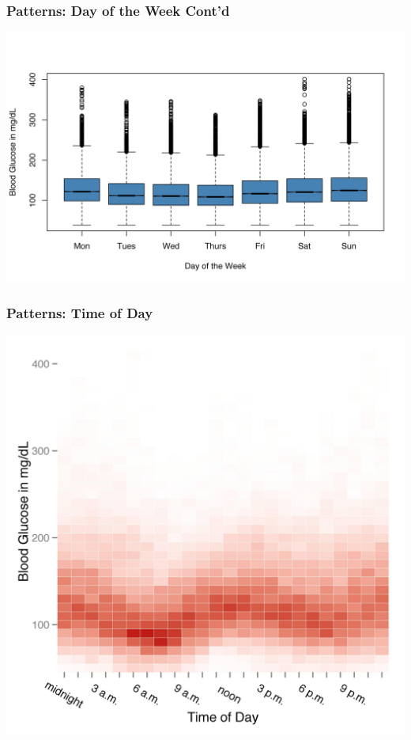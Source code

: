 \documentclass[handout]{beamer}
\begin{document}
\begin{frame}
  \frametitle{Patterns: Day of the Week Cont'd}
  
  \begin{center}
    \includegraphics[width=\textwidth]{day_boxplots.jpg}
  \end{center}

\end{frame}

\begin{frame}
  \frametitle{Patterns: Time of Day}
  
  \begin{center}
    \includegraphics[height=0.9\textheight]{all_heatmap.jpg}
  \end{center}
\end{frame}
\end{document}
